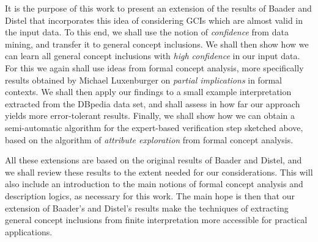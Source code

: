 It is the purpose of this work to present an extension of the results of Baader and Distel
that incorporates this idea of considering GCIs which are almost valid in the input data.
To this end, we shall use the notion of \emph{confidence} from data mining, and transfer
it to general concept inclusions.  We shall then show how we can learn all general concept
inclusions with \emph{high confidence} in our input data.  For this we again shall use
ideas from formal concept analysis, more specifically results obtained by Michael
Luxenburger on \emph{partial implications} in formal contexts.  We shall then apply our
findings to a small example interpretation extracted from the DBpedia data set, and shall
assess in how far our approach yields more error-tolerant results.  Finally, we shall show
how we can obtain a semi-automatic algorithm for the expert-based verification step
sketched above, based on the algorithm of \emph{attribute exploration} from formal concept
analysis.

All these extensions are based on the original results of Baader and Distel, and we shall
review these results to the extent needed for our considerations.  This will also include
an introduction to the main notions of formal concept analysis and description logics, as
necessary for this work.  The main hope is then that our extension of Baader's and
Distel's results make the techniques of extracting general concept inclusions from finite
interpretation more accessible for practical applications.

